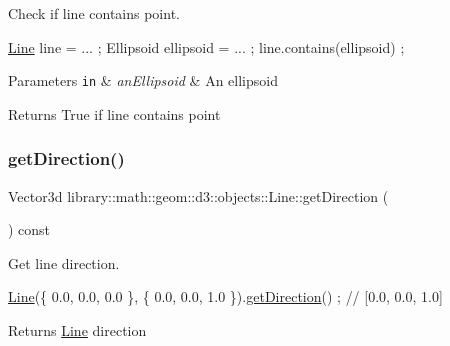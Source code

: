 Check if line contains point. 


\begin{DoxyCode}
\hyperlink{classlibrary_1_1math_1_1geom_1_1d3_1_1objects_1_1_line_a762e529453ff9ffa9233fd73737f4692}{Line} line = ... ;
Ellipsoid ellipsoid = ... ;
line.contains(ellipsoid) ;
\end{DoxyCode}



\begin{DoxyParams}[1]{Parameters}
\mbox{\tt in}  & {\em an\+Ellipsoid} & An ellipsoid \\
\hline
\end{DoxyParams}
\begin{DoxyReturn}{Returns}
True if line contains point 
\end{DoxyReturn}
\mbox{\label{classlibrary_1_1math_1_1geom_1_1d3_1_1objects_1_1_line_aa108a53227e4326188fe17a03c55f9cb}} 
\subsubsection{\texorpdfstring{get\+Direction()}{getDirection()}}
{\footnotesize\ttfamily Vector3d library\+::math\+::geom\+::d3\+::objects\+::\+Line\+::get\+Direction (\begin{DoxyParamCaption}{ }\end{DoxyParamCaption}) const}



Get line direction. 


\begin{DoxyCode}
\hyperlink{classlibrary_1_1math_1_1geom_1_1d3_1_1objects_1_1_line_a762e529453ff9ffa9233fd73737f4692}{Line}(\{ 0.0, 0.0, 0.0 \}, \{ 0.0, 0.0, 1.0 \}).\hyperlink{classlibrary_1_1math_1_1geom_1_1d3_1_1objects_1_1_line_aa108a53227e4326188fe17a03c55f9cb}{getDirection}() ; \textcolor{comment}{// [0.0, 0.0, 1.0]}
\end{DoxyCode}


\begin{DoxyReturn}{Returns}
\hyperlink{classlibrary_1_1math_1_1geom_1_1d3_1_1objects_1_1_line}{Line} direction 
\end{DoxyReturn}
\mbox{\label{classlibrary_1_1math_1_1geom_1_1d3_1_1objects_1_1_line_ad65178573d705ad21bdd54e7f4b7f104}} 
